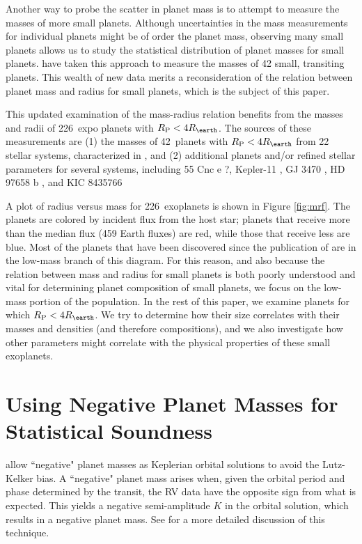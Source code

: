 \documentclass[11pt]{aastex}
\newcommand{\npl}{226~} %
\newcommand{\nhires}{42~} %
\newcommand{\rspecial}{4 \rearth}
\begin{document}
Another way to probe the scatter in planet mass is to attempt to measure the masses of more small planets.  Although uncertainties in the mass measurements for individual planets might be of order the planet mass, observing many small planets allows us to study the statistical distribution of planet masses for small planets.  \citet{Marcy2013} have taken this approach to measure the masses of 42 small, transiting planets.  This wealth of new data merits a reconsideration of the relation between planet mass and radius for small planets, which is the subject of this paper.

This updated examination of the mass-radius relation benefits from the masses and radii of \npl expo planets with $\rpl < \rspecial$.  The sources of these measurements are (1) the masses of \nhires planets with $\rpl < \rspecial$ from 22 stellar systems, characterized in \citet{Marcy2013}, and (2) additional planets and/or refined stellar parameters for several systems, including 55 Cnc e \citep{Endl2012}?, Kepler-11 \citep{Lissauer2013}, GJ 3470 \citep{Demory2013}, HD 97658 b \citep{Dragomir2013}, and KIC 8435766 \citep{Sanchis-Ojeda2013}

A plot of radius versus mass for \npl exoplanets is shown in Figure \ref{fig:mrf}.  The planets are colored by incident flux from the host star; planets that receive more than the median flux (459 Earth fluxes) are red, while those that receive less are blue.  Most of the planets that have been discovered since the publication of \citet{Weiss2013} are in the low-mass branch of this diagram.  For this reason, and also because the relation between mass and radius for small planets is both poorly understood and vital for determining planet composition of small planets, we focus on the low-mass portion of the population.  In the rest of this paper, we examine planets for which $\rpl < \rspecial$.  We try to determine how their size correlates with their masses and densities (and therefore compositions), and we also investigate how other parameters might correlate with the physical properties of these small exoplanets.

\section{Using Negative Planet Masses for Statistical Soundness}
\citet{Marcy2013} allow ``negative" planet masses as Keplerian orbital solutions to avoid the Lutz-Kelker bias.  A ``negative" planet mass arises when, given the orbital period and phase determined by the transit, the RV data have the opposite sign from what is expected.  This yields a negative semi-amplitude $K$ in the orbital solution, which results in a negative planet mass.  See \citet{Marcy2013} for a more detailed discussion of this technique.
 
\end{document}
